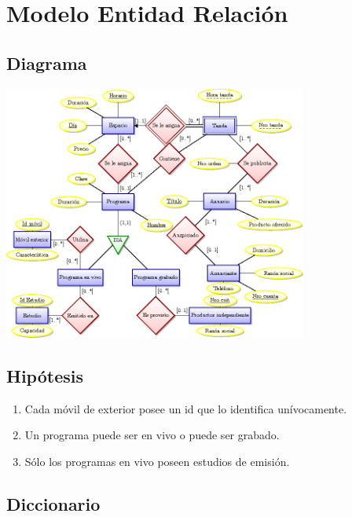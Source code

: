 \documentclass[a4paper,10pt]{article}
\begin{document}

\setcounter{page}{2}

\newpage
\thispagestyle{empty}
\tableofcontents

\newpage
\section{Modelo Entidad Relaci\'on}
  \subsection{Diagrama}
  \includegraphics[width=10cm]{ModeloE-R/ModeloE-R.png}
  
  \subsection{Hip\'otesis}
    \begin{enumerate}
      \item Cada m\'ovil de exterior posee un id que lo identifica un\'ivocamente. 
      \item Un programa puede ser en vivo o puede ser grabado.
      \item S\'olo los programas en vivo poseen estudios de emisi\'on.
    \end{enumerate}
    
  \subsection{Diccionario}
\end{document}
